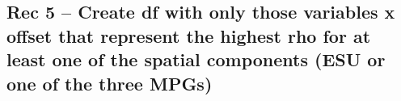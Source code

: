 \documentclass[]{article}
\newenvironment{Shaded}{\begin{snugshade}}{\end{snugshade}}
\newcommand{\KeywordTok}[1]{\textcolor[rgb]{0.13,0.29,0.53}{\textbf{{#1}}}}
\newcommand{\DecValTok}[1]{\textcolor[rgb]{0.00,0.00,0.81}{{#1}}}
\newcommand{\StringTok}[1]{\textcolor[rgb]{0.31,0.60,0.02}{{#1}}}
\newcommand{\CommentTok}[1]{\textcolor[rgb]{0.56,0.35,0.01}{\textit{{#1}}}}
\newcommand{\NormalTok}[1]{{#1}}
\begin{document}
\begin{Shaded}
\end{Shaded}

\subsection{Rec 5 -- Create df with only those variables x offset that
represent the highest rho for at least one of the spatial components
(ESU or one of the three
MPGs)}\label{rec-5-create-df-with-only-those-variables-x-offset-that-represent-the-highest-rho-for-at-least-one-of-the-spatial-components-esu-or-one-of-the-three-mpgs}
\end{document}
